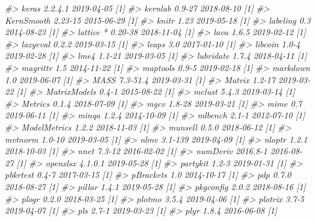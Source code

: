 \documentclass[]{krantz}
\makeatletter
\newenvironment{Shaded}{\begin{snugshade}}{\end{snugshade}}
\newcommand{\CommentTok}[1]{\textcolor[rgb]{0.37,0.37,0.37}{\textit{#1}}}
\newenvironment{kframe}{%
\medskip{}
\setlength{\fboxsep}{.8em}
 \def\at@end@of@kframe{}%
 \ifinner\ifhmode%
  \def\at@end@of@kframe{\end{minipage}}%
  \begin{minipage}{\columnwidth}%
 \fi\fi%
 \def\FrameCommand##1{\hskip\@totalleftmargin \hskip-\fboxsep
 \colorbox{shadecolor}{##1}\hskip-\fboxsep
     \hskip-\linewidth \hskip-\@totalleftmargin \hskip\columnwidth}%
 \MakeFramed {\advance\hsize-\width
   \@totalleftmargin\z@ \linewidth\hsize
   \@setminipage}}%
 {\par\unskip\endMakeFramed%
 \at@end@of@kframe}
\renewenvironment{Shaded}{\begin{kframe}}{\end{kframe}}
\makeatother
\begin{document}
\begin{Shaded}
\begin{Highlighting}[]
\CommentTok{#>    keras           2.2.4.1    2019-04-05 [1]}
\CommentTok{#>    kernlab         0.9-27     2018-08-10 [1]}
\CommentTok{#>    KernSmooth      2.23-15    2015-06-29 [1]}
\CommentTok{#>    knitr           1.23       2019-05-18 [1]}
\CommentTok{#>    labeling        0.3        2014-08-23 [1]}
\CommentTok{#>    lattice       * 0.20-38    2018-11-04 [1]}
\CommentTok{#>    lava            1.6.5      2019-02-12 [1]}
\CommentTok{#>    lazyeval        0.2.2      2019-03-15 [1]}
\CommentTok{#>    leaps           3.0        2017-01-10 [1]}
\CommentTok{#>    libcoin         1.0-4      2019-02-28 [1]}
\CommentTok{#>    lme4            1.1-21     2019-03-05 [1]}
\CommentTok{#>    lubridate       1.7.4      2018-04-11 [1]}
\CommentTok{#>    magrittr        1.5        2014-11-22 [1]}
\CommentTok{#>    maptools        0.9-5      2019-02-18 [1]}
\CommentTok{#>    markdown        1.0        2019-06-07 [1]}
\CommentTok{#>    MASS            7.3-51.4   2019-03-31 [1]}
\CommentTok{#>    Matrix          1.2-17     2019-03-22 [1]}
\CommentTok{#>    MatrixModels    0.4-1      2015-08-22 [1]}
\CommentTok{#>    mclust          5.4.3      2019-03-14 [1]}
\CommentTok{#>    Metrics         0.1.4      2018-07-09 [1]}
\CommentTok{#>    mgcv            1.8-28     2019-03-21 [1]}
\CommentTok{#>    mime            0.7        2019-06-11 [1]}
\CommentTok{#>    minqa           1.2.4      2014-10-09 [1]}
\CommentTok{#>    mlbench         2.1-1      2012-07-10 [1]}
\CommentTok{#>    ModelMetrics    1.2.2      2018-11-03 [1]}
\CommentTok{#>    munsell         0.5.0      2018-06-12 [1]}
\CommentTok{#>    mvtnorm         1.0-10     2019-03-05 [1]}
\CommentTok{#>    nlme            3.1-139    2019-04-09 [1]}
\CommentTok{#>    nloptr          1.2.1      2018-10-03 [1]}
\CommentTok{#>    nnet            7.3-12     2016-02-02 [1]}
\CommentTok{#>    numDeriv        2016.8-1   2016-08-27 [1]}
\CommentTok{#>    openxlsx        4.1.0.1    2019-05-28 [1]}
\CommentTok{#>    partykit        1.2-3      2019-01-31 [1]}
\CommentTok{#>    pbkrtest        0.4-7      2017-03-15 [1]}
\CommentTok{#>    pBrackets       1.0        2014-10-17 [1]}
\CommentTok{#>    pdp             0.7.0      2018-08-27 [1]}
\CommentTok{#>    pillar          1.4.1      2019-05-28 [1]}
\CommentTok{#>    pkgconfig       2.0.2      2018-08-16 [1]}
\CommentTok{#>    plogr           0.2.0      2018-03-25 [1]}
\CommentTok{#>    plotmo          3.5.4      2019-04-06 [1]}
\CommentTok{#>    plotrix         3.7-5      2019-04-07 [1]}
\CommentTok{#>    pls             2.7-1      2019-03-23 [1]}
\CommentTok{#>    plyr            1.8.4      2016-06-08 [1]}

\end{Highlighting}
\end{Shaded}
\end{document}
